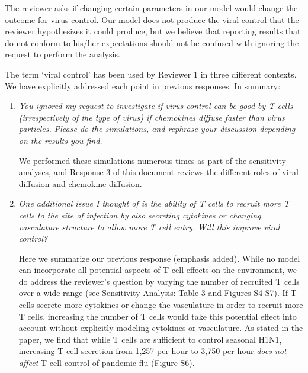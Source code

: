 \documentclass[10pt]{article}
\newenvironment{response}{\fontfamily{cmr}}{\par}
\begin{document}
\begin{enumerate}
\begin{response}

The reviewer asks if changing certain parameters in our model would
change the outcome for virus control. Our model does not produce the
viral control that the reviewer hypothesizes it could produce, but
we believe that reporting results that do not conform to his/her
expectations should not be confused with ignoring the request to perform
the analysis.

The term `viral control' has been used by Reviewer 1 in three different contexts.  We have explicitly addressed each point in previous responses.  In summary:

\begin{enumerate}
\item \textit{You ignored my request to investigate if virus control can be good by T cells (irrespectively of the type of virus) if chemokines diffuse faster than virus particles. Please do the simulations, and rephrase your discussion depending on the results you find.}
\begin{displayquote}
We performed these simulations numerous times as part of the
sensitivity analyses, and Response 3 of this document reviews the
different roles of viral diffusion and chemokine diffusion.  
\end{displayquote}

\item \textit{One additional issue I thought of is the ability of T cells to recruit more T cells to the site of infection by also secreting cytokines or changing vasculature structure to allow more T cell entry. Will this improve viral control?}

\begin{displayquote}
Here we summarize our previous response (emphasis added). While no model can incorporate all potential aspects of T cell effects on the environment, we do address the reviewer’s question by varying the number of recruited T cells over a wide range (see Sensitivity Analysis: Table 3 and Figures S4-S7). If T cells secrete more cytokines or change the vasculature in order to recruit more T cells, increasing the number of T cells would take this potential effect into account without explicitly modeling cytokines or vasculature. As stated in the paper, we find that while T cells are sufficient to control seasonal H1N1, increasing T cell secretion from 1,257 per hour to 3,750 per hour \emph{does not affect} T cell control of pandemic flu (Figure S6).
\end{displayquote}


\end{enumerate}
\end{response}
\end{enumerate}
\end{document}
